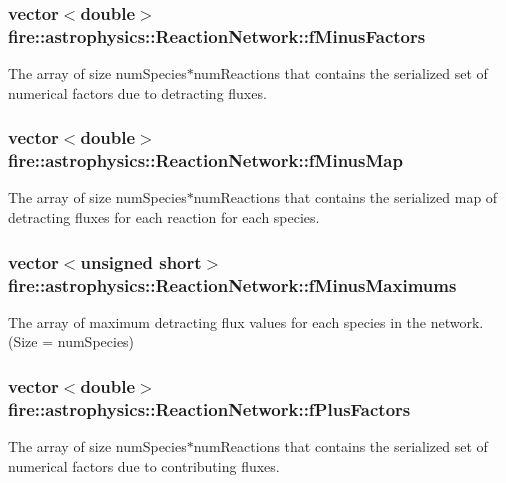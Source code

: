 \subsubsection[{\texorpdfstring{f\+Minus\+Factors}{fMinusFactors}}]{\setlength{\rightskip}{0pt plus 5cm}vector$<$double$>$ fire\+::astrophysics\+::\+Reaction\+Network\+::f\+Minus\+Factors}\hypertarget{a00243_a3aff20108c80e14f9f4d526a08af49de}{}\label{a00243_a3aff20108c80e14f9f4d526a08af49de}
The array of size num\+Species$\ast$num\+Reactions that contains the serialized set of numerical factors due to detracting fluxes. 
\subsubsection[{\texorpdfstring{f\+Minus\+Map}{fMinusMap}}]{\setlength{\rightskip}{0pt plus 5cm}vector$<$double$>$ fire\+::astrophysics\+::\+Reaction\+Network\+::f\+Minus\+Map}\hypertarget{a00243_a9065be108e95b1604b0d53e2080f0b57}{}\label{a00243_a9065be108e95b1604b0d53e2080f0b57}
The array of size num\+Species$\ast$num\+Reactions that contains the serialized map of detracting fluxes for each reaction for each species. 
\subsubsection[{\texorpdfstring{f\+Minus\+Maximums}{fMinusMaximums}}]{\setlength{\rightskip}{0pt plus 5cm}vector$<$unsigned short$>$ fire\+::astrophysics\+::\+Reaction\+Network\+::f\+Minus\+Maximums}\hypertarget{a00243_a4ea51dc9d41bf555592f93bb237e0440}{}\label{a00243_a4ea51dc9d41bf555592f93bb237e0440}
The array of maximum detracting flux values for each species in the network. (Size = num\+Species) 
\subsubsection[{\texorpdfstring{f\+Plus\+Factors}{fPlusFactors}}]{\setlength{\rightskip}{0pt plus 5cm}vector$<$double$>$ fire\+::astrophysics\+::\+Reaction\+Network\+::f\+Plus\+Factors}\hypertarget{a00243_aca9928041359ecf555a63e4f58e80164}{}\label{a00243_aca9928041359ecf555a63e4f58e80164}
The array of size num\+Species$\ast$num\+Reactions that contains the serialized set of numerical factors due to contributing fluxes. 
